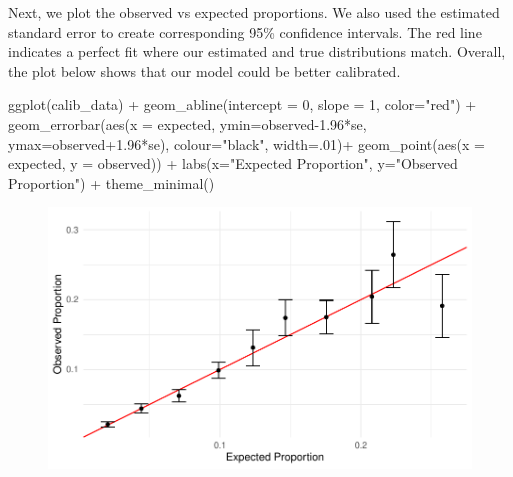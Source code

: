 \documentclass[
  letterpaper,
]{krantz}
\makeatletter
\newenvironment{Shaded}{\begin{snugshade}}{\end{snugshade}}
\newcommand{\AttributeTok}[1]{\textcolor[rgb]{0.40,0.45,0.13}{#1}}
\newcommand{\DecValTok}[1]{\textcolor[rgb]{0.68,0.00,0.00}{#1}}
\newcommand{\FloatTok}[1]{\textcolor[rgb]{0.68,0.00,0.00}{#1}}
\newcommand{\FunctionTok}[1]{\textcolor[rgb]{0.28,0.35,0.67}{#1}}
\newcommand{\NormalTok}[1]{\textcolor[rgb]{0.00,0.23,0.31}{#1}}
\newcommand{\SpecialCharTok}[1]{\textcolor[rgb]{0.37,0.37,0.37}{#1}}
\newcommand{\StringTok}[1]{\textcolor[rgb]{0.13,0.47,0.30}{#1}}
\newenvironment{kframe}{%
\medskip{}
\setlength{\fboxsep}{.8em}
 \def\at@end@of@kframe{}%
 \ifinner\ifhmode%
  \def\at@end@of@kframe{\end{minipage}}%
  \begin{minipage}{\columnwidth}%
 \fi\fi%
 \def\FrameCommand##1{\hskip\@totalleftmargin \hskip-\fboxsep
 \colorbox{shadecolor}{##1}\hskip-\fboxsep
     \hskip-\linewidth \hskip-\@totalleftmargin \hskip\columnwidth}%
 \MakeFramed {\advance\hsize-\width
   \@totalleftmargin\z@ \linewidth\hsize
   \@setminipage}}%
 {\par\unskip\endMakeFramed%
 \at@end@of@kframe}
\renewenvironment{Shaded}{\begin{kframe}}{\end{kframe}}
\makeatother
\begin{document}
Next, we plot the observed vs expected proportions. We also used the
estimated standard error to create corresponding 95\% confidence
intervals. The red line indicates a perfect fit where our estimated and
true distributions match. Overall, the plot below shows that our model
could be better calibrated.

\begin{Shaded}
\begin{Highlighting}[]
\FunctionTok{ggplot}\NormalTok{(calib\_data) }\SpecialCharTok{+} 
  \FunctionTok{geom\_abline}\NormalTok{(}\AttributeTok{intercept =} \DecValTok{0}\NormalTok{, }\AttributeTok{slope =} \DecValTok{1}\NormalTok{, }\AttributeTok{color=}\StringTok{"red"}\NormalTok{) }\SpecialCharTok{+} 
  \FunctionTok{geom\_errorbar}\NormalTok{(}\FunctionTok{aes}\NormalTok{(}\AttributeTok{x =}\NormalTok{ expected, }\AttributeTok{ymin=}\NormalTok{observed}\FloatTok{{-}1.96}\SpecialCharTok{*}\NormalTok{se, }
                    \AttributeTok{ymax=}\NormalTok{observed}\FloatTok{+1.96}\SpecialCharTok{*}\NormalTok{se), }
                \AttributeTok{colour=}\StringTok{"black"}\NormalTok{, }\AttributeTok{width=}\NormalTok{.}\DecValTok{01}\NormalTok{)}\SpecialCharTok{+}
  \FunctionTok{geom\_point}\NormalTok{(}\FunctionTok{aes}\NormalTok{(}\AttributeTok{x =}\NormalTok{ expected, }\AttributeTok{y =}\NormalTok{ observed)) }\SpecialCharTok{+}
  \FunctionTok{labs}\NormalTok{(}\AttributeTok{x=}\StringTok{"Expected Proportion"}\NormalTok{, }\AttributeTok{y=}\StringTok{"Observed Proportion"}\NormalTok{) }\SpecialCharTok{+}
  \FunctionTok{theme\_minimal}\NormalTok{()}
\end{Highlighting}
\end{Shaded}

\begin{figure}[H]

{\centering \includegraphics[width=1\textwidth,height=\textheight]{book/11_logistic_regression_files/figure-pdf/unnamed-chunk-17-1.pdf}

}

\end{figure}
\end{document}
